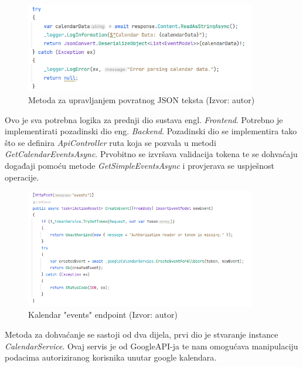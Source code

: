 \documentclass{foi}
\begin{document}
\begin{figure}[H]
    \centering
    \includegraphics[width=0.9\textwidth]{slike/calendarReturn.png}
    \caption{Metoda za upravljanjem povratnog JSON teksta (Izvor: autor)}
    \label{fig:calendarReturnList}

\end{figure}
Ovo je sva potrebna logika za prednji dio sustava {engl. \textit{Frontend}}. Potrebno je implementirati pozadinski dio {eng. \textit{Backend}}.
Pozadinski dio se implementira tako što se definira \textit{ApiController} ruta koja se pozvala u metodi \textit{GetCalendarEventsAsync}. 
Prvobitno se izvršava validacija tokena te se dohvaćaju događaji pomoću metode \textit{GetSimpleEventsAsync} i provjerava se uspješnost operacije.
\begin{figure}[H]
    \centering
    \includegraphics[width=0.9\textwidth]{slike/GetCalendarEventsEndpoint.png}
    \caption{Kalendar "events" endpoint (Izvor: autor)}
    \label{fig:GetCalendarEventsEndpoint}

\end{figure}
Metoda za dohvaćanje se sastoji od dva dijela, prvi dio je stvaranje instance \textit{CalendarService}. Ovaj servis je od GoogleAPI-ja te nam omogućava manipulaciju podacima autoriziranog korisnika unutar google kalendara.
\end{document}
